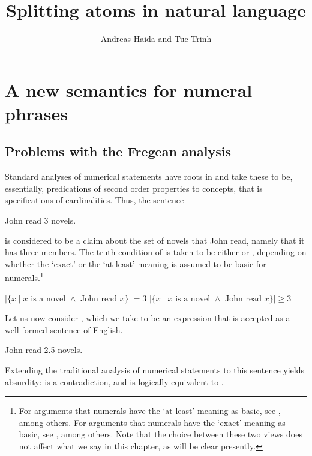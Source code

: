 \documentclass[output=paper]{langscibook}
\author{Andreas Haida\affiliation{The Hebrew University of Jerusalem} and  Tue Trinh\affiliation{Leibniz-Zentrum Allgemeine Sprachwissenschaft}}
\title{Splitting atoms in natural language}
\begin{document}
\maketitle

\section{A new semantics for numeral phrases}

\subsection{Problems with the Fregean analysis}

Standard analyses of numerical statements have roots in \citet{frege1884grundlagen} and take these to be, essentially, predications of second order properties to concepts, that is specifications of cardinalities. Thus, the sentence 

\ea 
John read 3 novels.
\label{hai-tri:3novels}
\z

\noindent is considered to be a claim about the set of novels that John read, namely that it has three members. The truth condition of  is taken to be either  or , depending on whether the `exact' or the `at least' meaning is assumed to be basic for numerals.\footnote{For arguments that numerals have the `at least' meaning as basic, see \citet{horn1972semantic,fintelheim1997classnotes,fintelfox2002classnotes,fox2007class}, among others. For arguments that numerals have the `exact' meaning as basic, see \citet{geurts2006take,breheny2008new}, among others. Note that the choice between these two views does not affect what we say in this chapter, as will be clear presently.}

\ea
\ea $|\{x \mid \text{$x$ is a novel $\wedge$ John read $x$}\}| = 3$ 
\label{hai-tri:eq3}
\ex $|\{x \mid \text{$x$ is a novel $\wedge$ John read $x$}\}| \geq 3$ 
\label{hai-tri:geq3}
\z
\z

\noindent Let us now consider , which we take to be an expression that is accepted as a well-formed sentence of English. 

\ea 
John read 2.5 novels. 
\label{hai-tri:2.5-1}
\z

\noindent Extending the traditional analysis of numerical statements to this sentence yields absurdity:  is a contradiction, and  is logically equivalent to .
\end{document}
